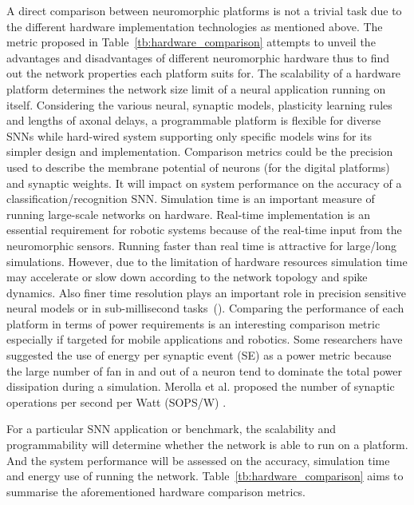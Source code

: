 A direct comparison between neuromorphic platforms is not a trivial task due to the different hardware implementation technologies as mentioned above.
The metric proposed in Table~\ref{tb:hardware_comparison} attempts to unveil the advantages and disadvantages of different neuromorphic hardware thus to find out the network properties each platform suits for.
The scalability of a hardware platform determines the network size limit of a neural application running on itself.
Considering the various neural, synaptic models, plasticity learning rules and lengths of axonal delays, a programmable platform is flexible for diverse SNNs while hard-wired system supporting only specific models wins for its simpler design and implementation.
Comparison metrics could be the precision used to describe the membrane potential of neurons (for the digital platforms) and synaptic weights.
It will impact on system performance on the accuracy of a classification/recognition SNN.
Simulation time is an important measure of running large-scale networks on hardware.
Real-time implementation is an essential requirement for robotic systems because of the real-time input from the neuromorphic sensors.
Running faster than real time is attractive for large/long simulations.
However, due to the limitation of hardware resources simulation time may accelerate or slow down according to the network topology and spike dynamics.
Also finer time resolution plays an important role in precision sensitive neural models or in sub-millisecond tasks~(\cite{lagorce2015breaking}).
Comparing the performance of each platform in terms of power requirements is an interesting comparison metric especially if targeted for mobile applications and robotics. Some researchers have suggested the use of energy per synaptic event (SE) \citep{Sharp2012110,strometal} as a power metric because the large number of fan in and out of a neuron tend to dominate the total power dissipation during a simulation. Merolla et al. proposed the number of synaptic operations per second per Watt (SOPS/W) \citep{Merolla08082014}. 

For a particular SNN application or benchmark, the scalability and programmability will determine whether the network is able to run on a platform.
And the system performance will be assessed on the accuracy, simulation time and energy use of running the network. 
Table~\ref{tb:hardware_comparison} aims to summarise the aforementioned hardware comparison metrics.
 


